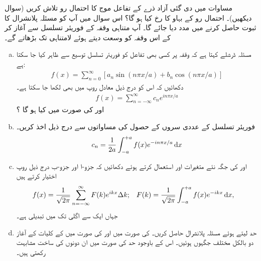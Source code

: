 مساوات  میں دی گئی آزاد ذرے کے تفاعل موج کا احتمال رو  تلاش کریں (سوال  دیکھیں)۔ احتمال رو کے بہاو کا رخ کیا ہو گا؟
اس سوال میں آپ کو مسئلہ پلانشرال کا ثبوت حاصل کرنے میں مدد دیا جائے گا۔ آپ متناہی وقفہ کے فوریئر تسلسل سے آغاز کر کے اس وقفہ کو وسعت دیتے ہوئے لامتناہی تک بڑھاتے گے۔ 

\begin{enumerate}[a. ]
\item 
مسئلہ ڈرشلے کہتا ہے کہ وقفہ  پر کسی بھی تفاعل  کو فوریئر تسلسل توسیع سے ظاہر کیا جا سکتا ہے:
\begin{align*}
f(x) = \sum_{n=0}^{\infty} [ a_{n}\sin( n\pi x/a ) + b_{n}\cos( n\pi x/a )]
\end{align*}
دکھائیں کہ اس کو درج ذیل معادل روپ میں بھی لکھا جا سکتا ہے۔
\begin{align*}
f(x) = \sum_{n=-\infty}^{\infty} c_{n}e^{i n \pi x /a }
\end{align*}
 اور  کی صورت میں  کیا ہو گا ؟
 \item
 فوریئر تسلسل کے عددی سروں کے حصول کی مساواتوں سے درج ذیل اخذ کریں۔
\begin{align*}
c_{n} = \frac{1}{2a} \int_{-a}^{+a} f(x)e^{-in\pi x/a} \dif x
\end{align*}
\item
{} اور  کی جگہ نئے متغیرات  اور 
  استعمال کرتے ہوئے دکھائیں کہ جزو-ا اور جزو-ب درج ذیل روپ اختیار کرتے ہیں 
\begin{align*}
f(x) &= \frac{1}{\sqrt{2 \pi }} \sum_{n=-\infty}^{\infty} F(k)e^{ikx} \Delta k; && F(k) = \frac{1}{\sqrt{2\pi}} \int_{-a}^{+a} f(x) e^{-ikx} \dif x,
\end{align*}
جہاں ایک  سے اگلی  تک  میں تبدیلی  ہے۔ 
\item
حد  لیتے ہوئے مسئلہ پلانشرال حاصل کریں۔   کی صورت میں  اور  کی صورت میں  کے کلیات کے آغاز دو بالکل مختلف جگہوں ہوئیں۔ اس کے باوجود حد  کی صورت میں ان دونوں کی ساخت مشابہت رکھتی ہیں۔ 
\end{enumerate}
